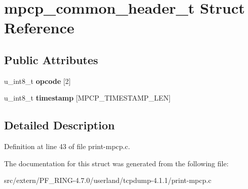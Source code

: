 \hypertarget{structmpcp__common__header__t}{
\section{mpcp\_\-common\_\-header\_\-t Struct Reference}
\label{structmpcp__common__header__t}
}
\subsection*{Public Attributes}
\begin{DoxyCompactItemize}
\item 
\hypertarget{structmpcp__common__header__t_a328efbac06ab6af78c82def3dcdf0e72}{
u\_\-int8\_\-t {\bfseries opcode} \mbox{[}2\mbox{]}}
\label{structmpcp__common__header__t_a328efbac06ab6af78c82def3dcdf0e72}

\item 
\hypertarget{structmpcp__common__header__t_a83d126d2dc70062b39cea91751130a9f}{
u\_\-int8\_\-t {\bfseries timestamp} \mbox{[}MPCP\_\-TIMESTAMP\_\-LEN\mbox{]}}
\label{structmpcp__common__header__t_a83d126d2dc70062b39cea91751130a9f}

\end{DoxyCompactItemize}


\subsection{Detailed Description}


Definition at line 43 of file print-\/mpcp.c.



The documentation for this struct was generated from the following file:\begin{DoxyCompactItemize}
\item 
src/extern/PF\_\-RING-\/4.7.0/userland/tcpdump-\/4.1.1/print-\/mpcp.c\end{DoxyCompactItemize}
